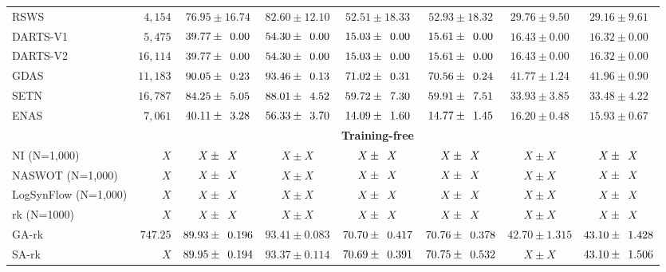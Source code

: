 \documentclass[sigconf]{acmart}
\begin{document}
\begin{table*}[htb]
\begin{tabular}{@{}lrcccccc@{}}
        RSWS      & $4,154$  & $76.95 \pm 16.74$                   & $82.60 \pm 12.10$                  & $52.51 \pm 18.33$                    & $52.93 \pm 18.32$                   & $29.76 \pm 9.50$                 & $29.16 \pm 9.61$                \\
        DARTS-V1  & $5,475$  & $39.77 \pm \z{0.00}$                & $54.30 \pm \z{0.00}$               & $15.03 \pm \z{0.00}$                 & $15.61 \pm \z{0.00}$                & $16.43 \pm 0.00$                 & $16.32 \pm 0.00$                \\
        DARTS-V2  & $16,114$ & $39.77 \pm \z{0.00}$                & $54.30 \pm \z{0.00}$               & $15.03 \pm \z{0.00}$                 & $15.61 \pm \z{0.00}$                & $16.43 \pm 0.00$                 & $16.32 \pm 0.00$                \\
        GDAS      & $11,183$ & $90.05 \pm \z{0.23}$                & $93.46 \pm \z{0.13}$               & $71.02 \pm \z{0.31}$                 & $70.56 \pm \z{0.24}$                & $41.77 \pm 1.24$                 & $41.96 \pm 0.90$                \\
        SETN      & $16,787$ & $84.25 \pm \z{5.05}$                & $88.01 \pm \z{4.52}$               & $59.72 \pm \z{7.30}$                 & $59.91 \pm \z{7.51}$                & $33.93 \pm 3.85$                 & $33.48 \pm 4.22$                \\
        ENAS      & $7,061$  & $40.11 \pm \z{3.28}$                & $56.33 \pm \z{3.70}$               & $14.09 \pm \z{1.60}$                 & $14.77 \pm \z{1.45}$                & $16.20 \pm 0.48$                 & $15.93 \pm 0.67$                \\ \midrule
        &&&&\textbf{Training-free}&&&\\
        NI (N=1,000)         & $X$ & $X\pm \z{X}$ & $X\pm X$ & $X\pm \z{X}$ & $X\pm \z{X}$ & $X\pm X$ & $X\pm \z{X}$ \\ 
        NASWOT (N=1,000)     & $X$ & $X\pm \z{X}$ & $X\pm X$ & $X\pm \z{X}$ & $X\pm \z{X}$ & $X\pm X$ & $X\pm \z{X}$ \\ 
        LogSynFlow (N=1,000) & $X$ & $X\pm \z{X}$ & $X\pm X$ & $X\pm \z{X}$ & $X\pm \z{X}$ & $X\pm X$ & $X\pm \z{X}$ \\ 
        rk (N=1000)          & $X$ & $X\pm \z{X}$ & $X\pm X$ & $X\pm \z{X}$ & $X\pm \z{X}$ & $X\pm X$ & $X\pm \z{X}$ \\ 
        GA-rk                & $747.25$ & $89.93\pm \z{0.196}$ & $93.41\pm0.083$ & $70.70\pm \z{0.417}$ & $70.76\pm \z{0.378}$ & $42.70\pm 1.315$ & $43.10\pm \z{1.428}$ \\ 
        SA-rk                & $X$ & $89.95\pm \z{0.194}$ & $93.37\pm0.114$ & $70.69\pm \z{0.391}$ & $70.75\pm \z{0.532}$ & $X\pm X$ & $43.10\pm \z{1.506}$ \\ \bottomrule
        \end{tabular}
        \label{table:overall_201}
          \vspace{-\baselineskip}
      \end{table*}
\end{document}
